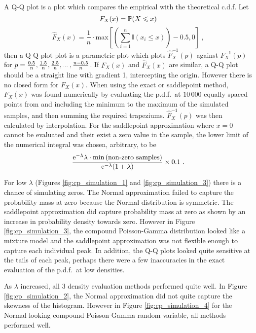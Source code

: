 A Q-Q plot is a plot which compares the empirical with the theoretical c.d.f. Let
\begin{equation}
	F_X(x) = \operatorname{\mathbb{P}}(X\leqslant x)
\end{equation}
\begin{equation}
	\widehat{F}_X(x) = \frac{1}{n}\cdot\text{max}
	\left[
		\left(\sum_{i=1}^n\mathbb{I}(x_i\leqslant x)\right)-0.5,0
	\right]
	\ ,
\end{equation}
then a Q-Q plot plot is a parametric plot which plots $\widehat{F}_X^{-1}(p)$ against $F_X^{-1}(p)$ for $p=\frac{0.5}{n},\frac{1.5}{n},\frac{2.5}{n},\dotdotdot,\frac{n-0.5}{n}$. If $F_X(x)$ and $\widehat{F}_X(x)$ are similar, a Q-Q plot should be a straight line with gradient 1, intercepting the origin. However there is no closed form for $F_X(x)$. When using the exact or saddlepoint method, $F_X(x)$ was found numerically by evaluating the p.d.f.~at $10\,000$ equally spaced points from and including the minimum to the maximum of the simulated samples, and then summing the required trapeziums. $\widehat{F}_X^{-1}(p)$ was then calculated by interpolation. For the saddlepoint approximation where $x=0$ cannot be evaluated and their exist a zero value in the sample, the lower limit of the numerical integral was chosen, arbitrary, to be
\begin{equation}
	\frac{
		\mathrm{e}^{-\lambda}\lambda\cdot\text{min}\left(\text{non-zero samples}\right)
	}
	{
		\mathrm{e}^{-\lambda}(1+\lambda)
	}
	\times 0.1
	\ .
\end{equation}

For low $\lambda$ (Figures \ref{fig:cp_simulation_1} and \ref{fig:cp_simulation_3}) there is a chance of simulating zeros. The Normal approximation failed to capture the probability mass at zero because the Normal distribution is symmetric. The saddlepoint approximation did capture probability mass at zero as shown by an increase in probability density towards zero. However in Figure \ref{fig:cp_simulation_3}, the compound Poisson-Gamma distribution looked like a mixture model and the saddlepoint approximation was not flexible enough to capture each individual peak. In addition, the Q-Q plots looked quite sensitive at the tails of each peak, perhaps there were a few inaccuracies in the exact evaluation of the p.d.f.~at low densities.

As $\lambda$ increased, all 3 density evaluation methods performed quite well. In Figure \ref{fig:cp_simulation_2}, the Normal approximation did not quite capture the skewness of the histogram. However in Figure \ref{fig:cp_simulation_4} for the Normal looking compound Poisson-Gamma random variable, all methods performed well.

